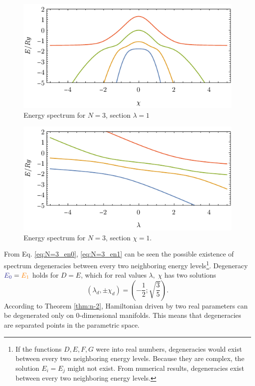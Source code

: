 \begin{figure}[h]
    \centering
    \includegraphics[scale=1.3]{../img/N=3_energiesl.pdf}
    \vspace{-3pt}\caption{Energy spectrum for $N=3$, section $\lambda=1$}
    \label{fig:N=3_energiesl}
\end{figure}
\begin{figure}[h]
    \centering
    \includegraphics[scale=1.3]{../img/N=3_energiesc.pdf}
    \vspace{-3pt}\caption{Energy spectrum for $N=3$, section $\chi=1$.}
    \label{fig:N=3_energiesc}
\end{figure}

From Eq. \ref{eq:N=3_en0}, \ref{eq:N=3_en1} can be seen the possible existence of spectrum degeneracies between every two neighboring energy levels\footnote{If the functions $D,E,F,G$ were into real numbers, degeneracies would exist between every two neighboring energy levels. Because they are complex, the solution $E_i=E_j$ might not exist. From numerical results, degeneracies exist between every two neighboring energy levels.}. Degeneracy $\bluee{E_0}=\textcolor{orange}{E_1}$ holds for $D=E$, which for real values $\lambda,\;\chi$ has two solutions
\begin{equation}
    (\lambda_d,\pm \chi_d)=\left(-\frac{1}{2};\sqrt{\frac{3}{5}}\right).
\end{equation}
According to Theorem \ref{thm:n-2}, Hamiltonian driven by two real parameters can be degenerated only on 0-dimensional manifolds. This means that degeneracies are separated points in the parametric space.

